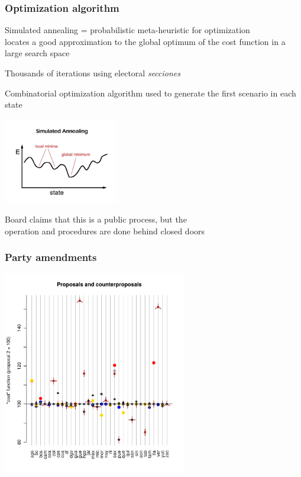 \documentclass[xcolor=dvipsnames]{beamer}  %
\begin{document}
\begin{frame}                      %
    \frametitle{Optimization algorithm}

Simulated annealing = probabilistic meta-heuristic for optimization \\ locates a good approximation to the global optimum of the cost function in a large search space

\bigskip

Thousands of iterations using electoral \emph{secciones} 

\bigskip

Combinatorial optimization algorithm used to generate 
the first scenario in each state


\begin{center}
   \includegraphics[width=5cm]{../../graphs/sim.pdf}
\end{center}

Board claims that this is a public process, but the \\ operation and procedures are done \alert{behind closed doors}

\end{frame}
\begin{frame}                                       %

    \frametitle{Party amendments}
\begin{center}
   \includegraphics[width=8cm]{../../graphs/propsAndCost.pdf}
\end{center}
\end{frame}
\end{document}
